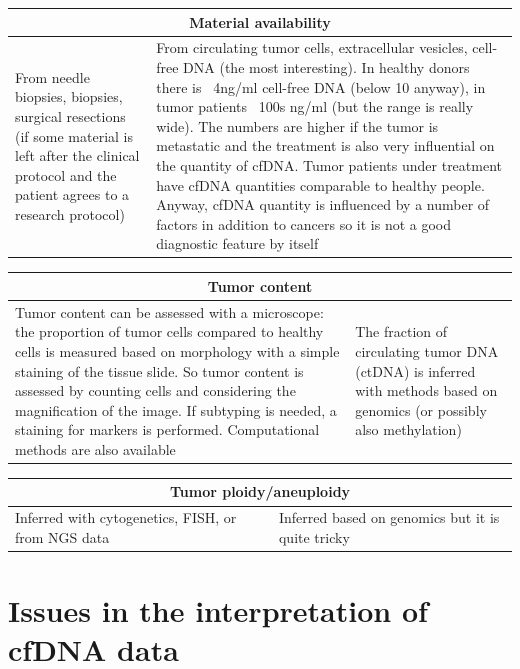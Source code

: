 \begin{tabular}{ | m{7cm}| m{7cm} | }
 \hline
 \multicolumn{2}{|c|}{Material availability} \\
 \hline
 From needle biopsies, biopsies, surgical resections (if some material is left after the clinical protocol and the patient agrees to a research protocol) & From circulating tumor cells, extracellular vesicles, cell-free DNA (the most interesting). In healthy donors there is ~4ng/ml cell-free DNA (below 10 anyway), in tumor patients ~100s ng/ml (but the range is really wide). The numbers are higher if the tumor is metastatic and the treatment is also very influential on the quantity of cfDNA. Tumor patients under treatment have cfDNA quantities comparable to healthy people. Anyway, cfDNA quantity is influenced by a number of factors in addition to cancers so it is not a good diagnostic feature by itself \\
 \hline
\end{tabular}

\begin{tabular}{ | m{7cm}| m{7cm} | }
 \hline
 \multicolumn{2}{|c|}{Tumor content} \\
 \hline
 Tumor content can be assessed with a microscope: the proportion of tumor cells compared to healthy cells is measured based on morphology with a simple staining of the tissue slide. So tumor content is assessed by counting cells and considering the magnification of the image. If subtyping is needed, a staining for markers is performed. Computational methods are also available & The fraction of circulating tumor DNA (ctDNA) is inferred with methods based on genomics (or possibly also methylation) \\
 \hline
\end{tabular}

\begin{tabular}{ | m{7cm}| m{7cm} | }
 \hline
 \multicolumn{2}{|c|}{Tumor ploidy/aneuploidy } \\
 \hline
 Inferred with cytogenetics, FISH, or from NGS data & Inferred based on genomics but it is quite tricky \\
 \hline
 
\end{tabular}

\section{Issues in the interpretation of cfDNA data}

